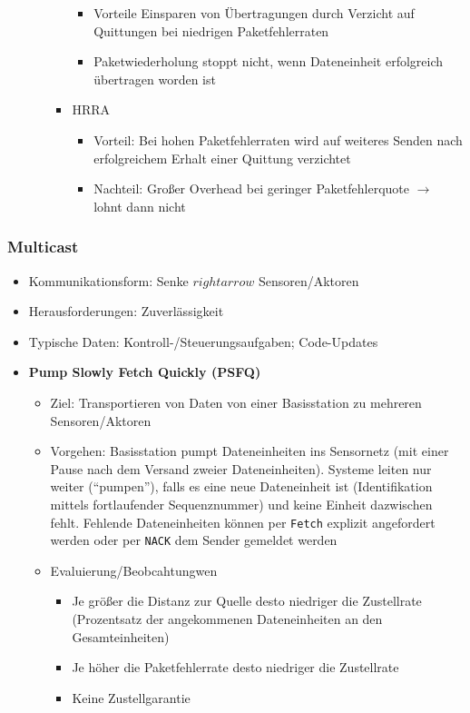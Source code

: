 \begin{itemize}
\begin{itemize}
\begin{itemize}
\begin{itemize}
				\item Vorteile Einsparen von Übertragungen durch Verzicht auf Quittungen bei niedrigen Paketfehlerraten
				\item Paketwiederholung stoppt nicht, wenn Dateneinheit erfolgreich übertragen worden ist
			\end{itemize}
			\item HRRA
			\begin{itemize}
				\item Vorteil: Bei hohen Paketfehlerraten wird auf weiteres Senden nach erfolgreichem Erhalt einer Quittung verzichtet
				\item Nachteil: Großer Overhead bei geringer Paketfehlerquote \(\rightarrow\) lohnt dann nicht
			\end{itemize}
		\end{itemize}
	\end{itemize}
\end{itemize}

\subsubsection{Multicast}
\begin{itemize}
	\item Kommunikationsform: Senke \(rightarrow\) Sensoren/Aktoren
	\item Herausforderungen: Zuverlässigkeit
	\item Typische Daten: Kontroll-/Steuerungsaufgaben; Code-Updates
	\item \textbf{Pump Slowly Fetch Quickly (PSFQ)}
	\begin{itemize}
		\item Ziel: Transportieren von Daten von einer Basisstation zu mehreren Sensoren/Aktoren
		\item Vorgehen: Basisstation pumpt Dateneinheiten ins Sensornetz (mit einer Pause nach dem Versand zweier Dateneinheiten). Systeme leiten nur weiter ("`pumpen"'), falls es eine neue Dateneinheit ist (Identifikation mittels fortlaufender Sequenznummer) und keine Einheit dazwischen fehlt. Fehlende Dateneinheiten können per \texttt{Fetch} explizit angefordert werden oder per \texttt{NACK} dem Sender gemeldet werden
		\item Evaluierung/Beobcahtungwen
		\begin{itemize}
			\item Je größer die Distanz zur Quelle desto niedriger die Zustellrate (Prozentsatz der angekommenen Dateneinheiten an den Gesamteinheiten)
			\item Je höher die Paketfehlerrate desto niedriger die Zustellrate
			\item Keine Zustellgarantie
		\end{itemize}
	\end{itemize}
\end{itemize}

